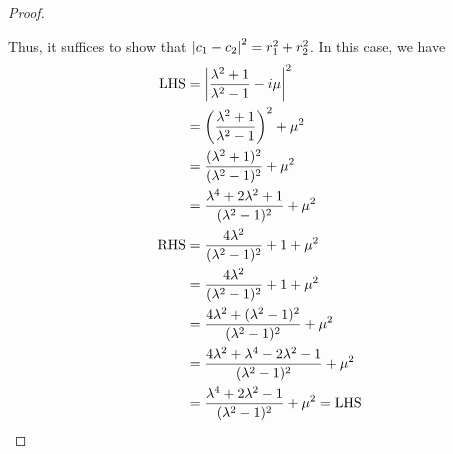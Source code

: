 \documentclass[12pt]{article}
\begin{document}
\begin{proof}
\begin{center}
        \end{center}
        Thus, it suffices to show that $\left\lvert c_{1}-c_{2} \right\rvert^{2} = r_{1}^{2} + r_{2}^{2}$.
        In this case, we have
        \begin{align*}
            \text{LHS} 
            &= \left\lvert \frac{\lambda^{2}+1}{\lambda^{2}-1}-i\mu \right\rvert^{2}\\
            &= \left(\frac{\lambda^{2}+1}{\lambda^{2}-1}\right)^{2}+\mu^{2}\\
            &= \frac{(\lambda^{2}+1)^{2}}{(\lambda^{2}-1)^{2}}+\mu^{2}\\
            &= \frac{\lambda^{4}+2\lambda^{2}+1}{(\lambda^{2}-1)^{2}}+\mu^{2}\\
            \text{RHS}
            &= \frac{4\lambda^{2}}{(\lambda^{2}-1)^{2}}+1+\mu^{2}\\
            &= \frac{4\lambda^{2}}{(\lambda^{2}-1)^{2}}+1+\mu^{2}\\
            &= \frac{4\lambda^{2}+(\lambda^{2}-1)^{2}}{(\lambda^{2}-1)^{2}}+\mu^{2}\\
            &= \frac{4\lambda^{2}+\lambda^{4}-2\lambda^{2}-1}{(\lambda^{2}-1)^{2}}+\mu^{2}\\
            &= \frac{\lambda^{4}+2\lambda^{2}-1}{(\lambda^{2}-1)^{2}}+\mu^{2} = \text{LHS}
        \end{align*}
    \end{proof}
\end{document}
